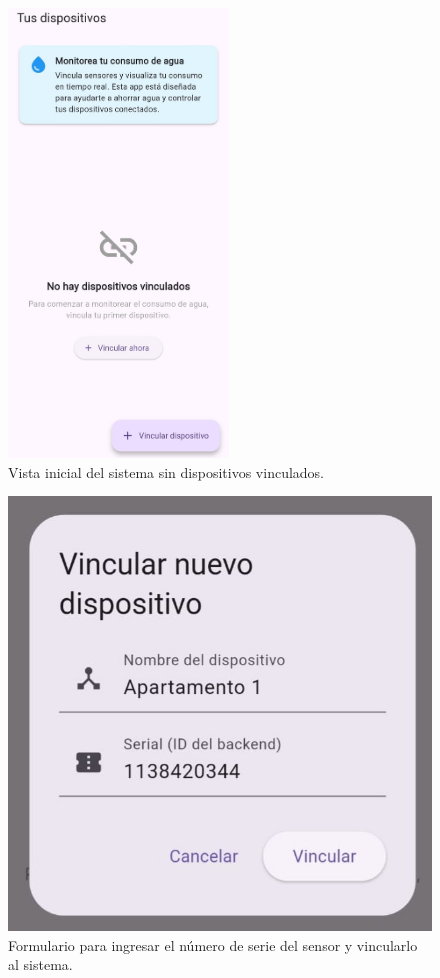\documentclass[conference]{IEEEtran}
\begin{document}
\begin{figure}[htbp]
    \centerline{\includegraphics[width=\linewidth, height=450px]{Prototipo2.jpeg}}
    \caption{Vista inicial del sistema sin dispositivos vinculados.}
    \label{fig}
\end{figure}

\newpage

\begin{figure}[htbp]
    \centerline{\includegraphics[width=\linewidth]{Prototipo3.jpg}}
    \caption{Formulario para ingresar el número de serie del sensor y vincularlo al sistema.}
    \label{fig}
\end{figure}
\end{document}
